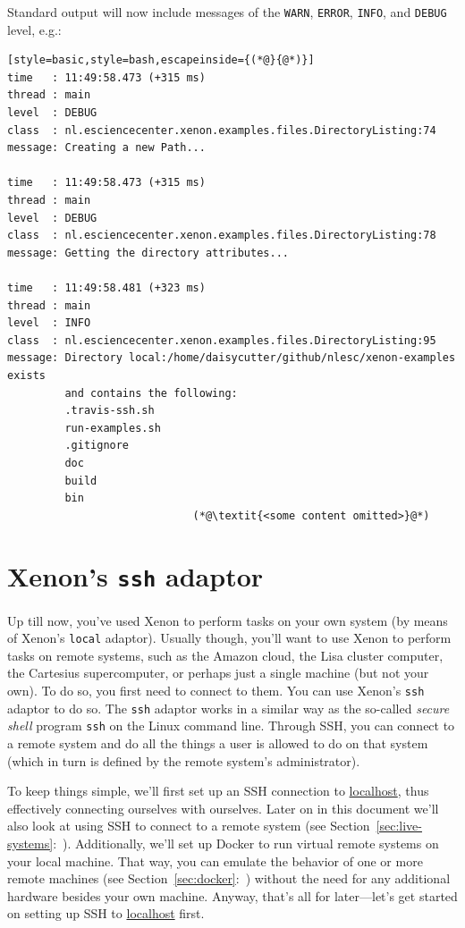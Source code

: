 \documentclass[12pt, a4paper, twoside, openany, titlepage]{book}
\begin{document}
Standard output will now include messages of the \texttt{WARN}, \texttt{ERROR}, \texttt{INFO}, and \texttt{DEBUG} level, e.g.:
\begin{lstlisting}[style=basic,style=bash,escapeinside={(*@}{@*)}]
time   : 11:49:58.473 (+315 ms)
thread : main
level  : DEBUG
class  : nl.esciencecenter.xenon.examples.files.DirectoryListing:74
message: Creating a new Path...

time   : 11:49:58.473 (+315 ms)
thread : main
level  : DEBUG
class  : nl.esciencecenter.xenon.examples.files.DirectoryListing:78
message: Getting the directory attributes...

time   : 11:49:58.481 (+323 ms)
thread : main
level  : INFO
class  : nl.esciencecenter.xenon.examples.files.DirectoryListing:95
message: Directory local:/home/daisycutter/github/nlesc/xenon-examples exists
         and contains the following:
         .travis-ssh.sh
         run-examples.sh
         .gitignore
         doc
         build
         bin
                             (*@\textit{<some content omitted>}@*)
\end{lstlisting}



\section{Xenon's \texttt{ssh} adaptor}

Up till now, you've used Xenon to perform tasks on your own system (by means of Xenon's \texttt{local} adaptor). Usually though, you'll want to use Xenon to perform tasks on remote systems, such as the Amazon cloud, the Lisa cluster computer, the Cartesius supercomputer, or perhaps just a single machine (but not your own). To do so, you first need to connect to them. You can use Xenon's \texttt{ssh} adaptor to do so. The \texttt{ssh} adaptor works in a similar way as the so-called \textit{secure shell} program \texttt{ssh} on the Linux command line. Through SSH, you can connect to a remote system and do all the things a user is allowed to do on that system (which in turn is defined by the remote system's administrator).

To keep things simple, we'll first set up an SSH connection to \url{localhost}, thus effectively connecting ourselves with ourselves. Later on in this document we'll also look at using SSH to connect to a remote system (see Section~\ref{sec:live-systems}:~\textit{}). Additionally, we'll set up Docker to run virtual remote systems on your local machine. That way, you can emulate the behavior of one or more remote machines (see Section~\ref{sec:docker}:~\textit{}) without the need for any additional hardware besides your own machine. Anyway, that's all for later---let's get started on setting up SSH to \url{localhost} first.
\end{document}
